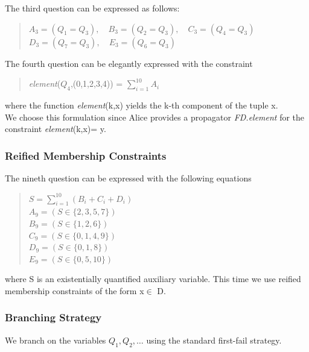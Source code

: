 \documentclass[a4paper]{scrartcl}
\begin{document}
The third question can be expressed as follows:
\begin{quote} 
$ A_3=(Q_1=Q_3),\quad B_3=(Q_2=Q_3),\quad C_3=(Q_4=Q_3)$\\ 
$ D_3=(Q_7=Q_3),\quad E_3=(Q_6=Q_3)$ 
\end{quote}

The fourth question can be elegantly expressed with the constraint
\begin{quote}
    {\it element}($Q_4$,(0,1,2,3,4)) = $\sum_{i=1}^{10}{A_i}$
\end{quote}
where the function {\it element}(k,x) yields the k-th component 
of the tuple x.\\
We choose this formulation since Alice provides a propagator 
{\it FD.element} 
for the constraint {\it element}(k,x)= y.

\subsubsection{Reified Membership Constraints}
The nineth question can be expressed with the following equations
\begin{quote}
$ S = \sum_{i=1}^{10}{(B_i+C_i+D_i)} $\\
$A_9 = (S\in\{2,3,5,7\}) $\\ 
$B_9 = (S\in\{1,2,6\}) $\\ 
$C_9 = (S\in\{0,1,4,9\}) $\\
$ D_9 = (S\in\{0,1,8\}) $\\ 
$E_9 = (S\in\{0,5,10\}) $
\end{quote}
where S is an existentially quantified auxiliary variable. 
This time we use reified membership constraints of the form x$\in$ D.

\subsubsection{Branching Strategy}
We branch on the variables $Q_1,Q_2,\ldots$ using the standard first-fail strategy.
\end{document}
